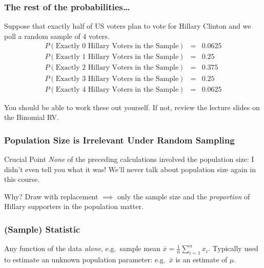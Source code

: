 \documentclass[handout]{beamer}
\begin{document}
\begin{frame}
  \frametitle{The rest of the probabilities\dots}
  Suppose that exactly half of US voters plan to vote for Hillary Clinton and we poll a random sample of 4 voters.
  \begin{eqnarray*}
    P\left( \mbox{Exactly 0 Hillary Voters in the Sample} \right) &=& 0.0625\\
    P\left( \mbox{Exactly 1 Hillary Voters in the Sample} \right) &=& 0.25\\
    P\left( \mbox{Exactly 2 Hillary Voters in the Sample} \right) &=& 0.375\\
    P\left( \mbox{Exactly 3 Hillary Voters in the Sample} \right) &=& 0.25\\
    P\left( \mbox{Exactly 4 Hillary Voters in the Sample} \right) &=& 0.0625 
  \end{eqnarray*}

  \vspace{1em}
  \alert{You should be able to work these out yourself. If not, review the lecture slides on the Binomial RV.}
\end{frame}
\begin{frame}
  \frametitle{Population Size is Irrelevant Under Random Sampling}

  \begin{block}{Crucial Point}
    \emph{None} of the preceding calculations involved the population size: I didn't even tell you what it was!
    We'll never talk about population size again in this course.
  \end{block}

  \begin{block}{Why?}
    Draw with replacement $\implies$ only the sample size and the \emph{proportion} of Hillary supporters in the population matter.
  \end{block}

\end{frame}
\begin{frame}
  \frametitle{(Sample) Statistic}

  Any function of the data \emph{alone}, e.g.\ sample mean $\bar{x} = \frac{1}{n}\sum_{i=1}^n x_i$. Typically used to estimate an unknown population parameter: e.g.\ $\bar{x}$ is an estimate of $\mu$.

\end{frame}
\end{document}
